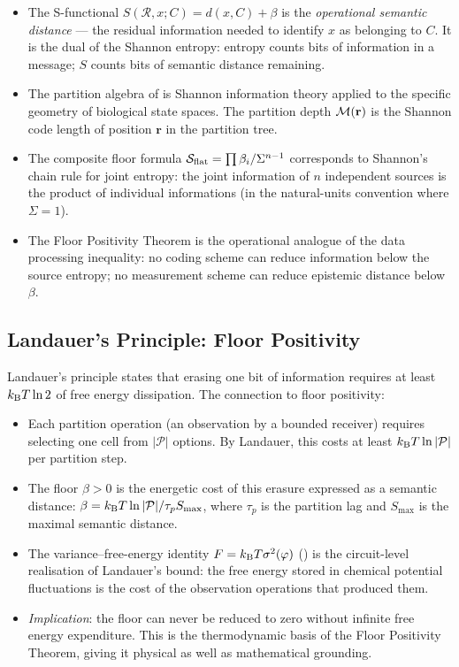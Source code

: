 \begin{itemize}[leftmargin=2em]
  \item The S-functional $S(\mathcal{R}, x; C) = d(x, C) + \beta$ is the
    \emph{operational semantic distance} — the residual information needed to
    identify $x$ as belonging to $C$.  It is the dual of the Shannon entropy:
    entropy counts bits of information in a message; $S$ counts bits of
    semantic distance remaining.
  \item The partition algebra of  is Shannon
    information theory applied to the specific geometry of biological state
    spaces.  The partition depth $\mathcal{M}(\mathbf{r})$ is the Shannon code
    length of position $\mathbf{r}$ in the partition tree.
  \item The composite floor formula $\mathcal{S}_{\mathrm{flat}} = \prod \beta_i / \Sigma^{n-1}$
    corresponds to Shannon's chain rule for joint entropy: the joint
    information of $n$ independent sources is the product of individual
    informations (in the natural-units convention where $\Sigma = 1$).
  \item The Floor Positivity Theorem is the operational analogue of the
    data processing inequality: no coding scheme can reduce information below
    the source entropy; no measurement scheme can reduce epistemic distance
    below $\beta$.
\end{itemize}

\subsection{Landauer's Principle: Floor Positivity}

Landauer's principle \citep{Landauer1961} states that erasing one bit of
information requires at least $k_{\mathrm{B}} T \ln 2$ of free energy dissipation.
The connection to floor positivity:

\begin{itemize}[leftmargin=2em]
  \item Each partition operation (an observation by a bounded receiver)
    requires selecting one cell from $|\mathcal{P}|$ options.  By Landauer,
    this costs at least $k_{\mathrm{B}} T \ln |\mathcal{P}|$ per partition step.
  \item The floor $\beta > 0$ is the energetic cost of this erasure expressed
    as a semantic distance: $\beta = k_{\mathrm{B}} T \ln |\mathcal{P}| / \tau_p S_{\max}$,
    where $\tau_p$ is the partition lag and $S_{\max}$ is the maximal semantic
    distance.
  \item The variance--free-energy identity $F = k_{\mathrm{B}} T \sigma^2(\varphi)$
    () is the circuit-level realisation of
    Landauer's bound: the free energy stored in chemical potential fluctuations
    is the cost of the observation operations that produced them.
  \item \emph{Implication}: the floor can never be reduced to zero without
    infinite free energy expenditure.  This is the thermodynamic basis of the
    Floor Positivity Theorem, giving it physical as well as mathematical
    grounding.
\end{itemize}

